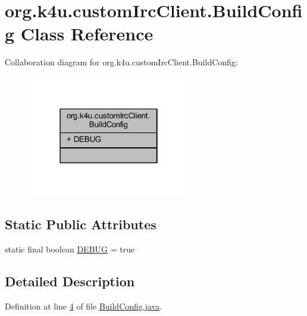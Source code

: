 \hypertarget{classorg_1_1k4u_1_1custom_irc_client_1_1_build_config}{\section{org.\-k4u.\-custom\-Irc\-Client.\-Build\-Config Class Reference}
\label{d5/de7/classorg_1_1k4u_1_1custom_irc_client_1_1_build_config}
}


Collaboration diagram for org.\-k4u.\-custom\-Irc\-Client.\-Build\-Config\-:\nopagebreak
\begin{figure}[H]
\begin{center}
\leavevmode
\includegraphics[width=202pt]{d5/d89/classorg_1_1k4u_1_1custom_irc_client_1_1_build_config__coll__graph}
\end{center}
\end{figure}
\subsection*{Static Public Attributes}
\begin{DoxyCompactItemize}
\item 
static final boolean \hyperlink{classorg_1_1k4u_1_1custom_irc_client_1_1_build_config_a135b5a8667d45f9c291cd2f86a4338f2}{D\-E\-B\-U\-G} = true
\end{DoxyCompactItemize}


\subsection{Detailed Description}


Definition at line \hyperlink{_build_config_8java_source_l00004}{4} of file \hyperlink{_build_config_8java_source}{Build\-Config.\-java}.



